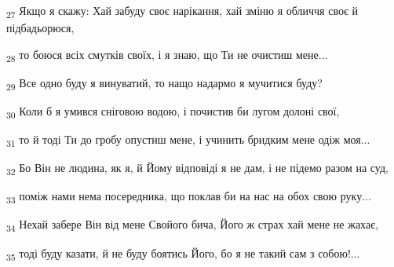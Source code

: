 \begin{tcolorbox}
\textsubscript{27} Якщо я скажу: Хай забуду своє нарікання, хай зміню я обличчя своє й підбадьорюся,
\end{tcolorbox}
\begin{tcolorbox}
\textsubscript{28} то боюся всіх смутків своїх, і я знаю, що Ти не очистиш мене...
\end{tcolorbox}
\begin{tcolorbox}
\textsubscript{29} Все одно буду я винуватий, то нащо надармо я мучитися буду?
\end{tcolorbox}
\begin{tcolorbox}
\textsubscript{30} Коли б я умився сніговою водою, і почистив би лугом долоні свої,
\end{tcolorbox}
\begin{tcolorbox}
\textsubscript{31} то й тоді Ти до гробу опустиш мене, і учинить бридким мене одіж моя...
\end{tcolorbox}
\begin{tcolorbox}
\textsubscript{32} Бо Він не людина, як я, й Йому відповіді я не дам, і не підемо разом на суд,
\end{tcolorbox}
\begin{tcolorbox}
\textsubscript{33} поміж нами нема посередника, що поклав би на нас на обох свою руку...
\end{tcolorbox}
\begin{tcolorbox}
\textsubscript{34} Нехай забере Він від мене Свойого бича, Його ж страх хай мене не жахає,
\end{tcolorbox}
\begin{tcolorbox}
\textsubscript{35} тоді буду казати, й не буду боятись Його, бо я не такий сам з собою!...
\end{tcolorbox}
